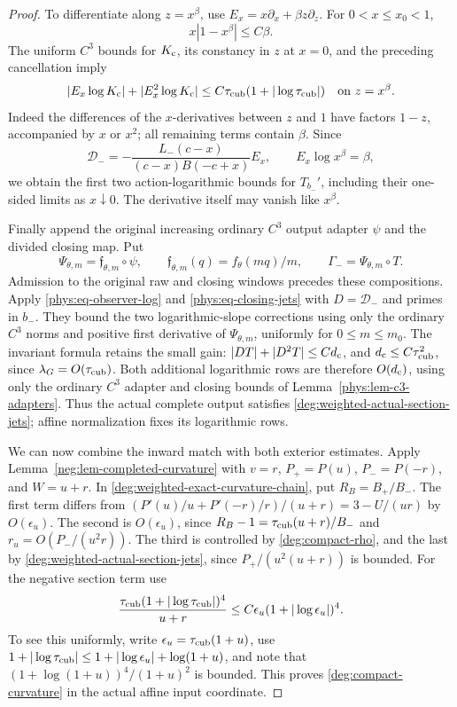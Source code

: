 \begin{proof}
To differentiate along \(z=x^\beta\), use
\(E_x=x\partial_x+\beta z\partial_z\). For
\(0<x\le x_0<1\),
\[
 x|1-x^\beta|\le C\beta.
\]
The uniform \(C^3\) bounds for \(K_{\rm c}\), its constancy in
\(z\) at \(x=0\), and the preceding cancellation imply
\[
 |E_x\log K_{\rm c}|+|E_x^2\log K_{\rm c}|
       \le C\tau_{\rm cub}(1+|\log\tau_{\rm cub}|)
       \quad\hbox{on }z=x^\beta.
\]
Indeed the differences of the \(x\)-derivatives between \(z\)
and \(1\) have factors \(1-z\), accompanied by \(x\) or
\(x^2\); all remaining terms contain \(\beta\).
Since
\[
 \mathcal D_-=-\frac{L_-(c-x)}{(c-x)B(-c+x)}E_x,
 \qquad E_x\log x^\beta=\beta,
\]
we obtain the first two action-logarithmic bounds for
\(T_{b_-}'\), including their one-sided limits as \(x\downarrow0\).
The derivative itself may vanish like \(x^\beta\).

Finally append the original increasing ordinary \(C^3\) output adapter
\(\psi\) and the divided closing map. Put
\[
 \Psi_{\theta,m}=\mathfrak f_{\theta,m}\circ\psi,
 \qquad \mathfrak f_{\theta,m}(q)=f_\theta(mq)/m,
 \qquad \Gamma_-=\Psi_{\theta,m}\circ T.
\]
Admission to the original raw and closing windows precedes these
compositions. Apply \eqref{phys:eq-observer-log} and
\eqref{phys:eq-closing-jets} with \(D=\mathcal D_-\) and primes in
\(b_-\). They bound the two logarithmic-slope corrections using only
the ordinary \(C^3\) norms and positive first derivative of
\(\Psi_{\theta,m}\), uniformly for \(0\le m\le m_0\).
The invariant formula retains the small gain:
\(|DT|+|D^2T|\le Cd_{\rm c}\), and
\(d_{\rm c}\le C\tau_{\rm cub}^2\), since \(\lambda_G=O(\tau_{\rm cub})\).
Both additional logarithmic rows are therefore \(O(d_{\rm c})\),
using only the ordinary \(C^3\) adapter and closing bounds of
Lemma~\ref{phys:lem-c3-adapters}. Thus the actual complete output
satisfies \eqref{deg:weighted-actual-section-jets}; affine normalization
fixes its logarithmic rows.

We can now combine the inward match with both exterior estimates.
Apply Lemma~\ref{neg:lem-completed-curvature} with
\(v=r\), \(P_+=P(u)\), \(P_-=P(-r)\), and \(W=u+r\).
In \eqref{deg:weighted-exact-curvature-chain}, put \(R_B=B_+/B_-\).
The first term differs from
\((P'(u)/u+P'(-r)/r)/(u+r)=3-U/(ur)\) by
\(O(\epsilon_u)\).  The second is \(O(\epsilon_u)\), since
\(R_B-1=\tau_{\rm cub}(u+r)/B_-\) and
\(r_u=O(P_-/(u^2r))\).  The third is controlled by
\eqref{deg:compact-rho}, and the last by
\eqref{deg:weighted-actual-section-jets}, since
\(P_+/(u^2(u+r))\) is bounded.  For the negative section term use
\[
 \frac{\tau_{\rm cub}(1+|\log\tau_{\rm cub}|)^4}{u+r}
       \le C\epsilon_u(1+|\log\epsilon_u|)^4.
\]
To see this uniformly, write \(\epsilon_u=\tau_{\rm cub}(1+u)\), use
\(1+|\log\tau_{\rm cub}|\le1+|\log\epsilon_u|+\log(1+u)\), and note that
\((1+\log(1+u))^4/(1+u)^2\) is bounded.
This proves \eqref{deg:compact-curvature} in the actual affine
input coordinate.
\end{proof}
